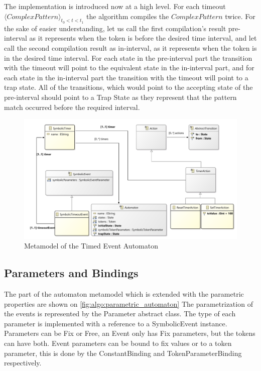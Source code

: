 The implementation is introduced now at a high level. For each timeout \\ $\langle \mathit{Complex Pattern} \rangle_{t_0 < t < t_1}$ the algorithm compiles the $\mathit{ComplexPattern}$ twice. For the sake of easier understanding, let us call the first compilation's result  pre-interval as it represents when the token is before the desired time interval, and let call the second compilation result as in-interval, as it represents when the token is in the desired time interval. For each state in the pre-interval part the transition with the timeout will point to the equivalent state in the in-interval part, and for each state in the in-interval part the transition with the timeout will point to a trap state. All of the transitions, which would point to the accepting state of the pre-interval should point to a Trap State as they represent that the pattern match occurred before the required interval.
  
\begin{figure}[h]
	\centering
	\includegraphics[width=\linewidth]{figures/chapter_5/Timing_diagram}
	\caption{Metamodel of the Timed Event Automaton}
	\label{fig:algo:timed_automaton}
\end{figure}

\subsection{Parameters and Bindings}
\label{section:algo:emfparameterhandilng}

The part of the automaton metamodel which is extended with the parametric properties are shown on \cref{fig:algo:parametric_automaton}
The parametrization of the events is represented by the Parameter abstract class. The type of each parameter is implemented with a reference to a SymbolicEvent instance. Parameters can be Fix or Free, an Event only has Fix parameters, but the tokens can have both. Event parameters can be bound to fix values or to a token parameter, this is done by the ConstantBinding and TokenParameterBinding respectively.

